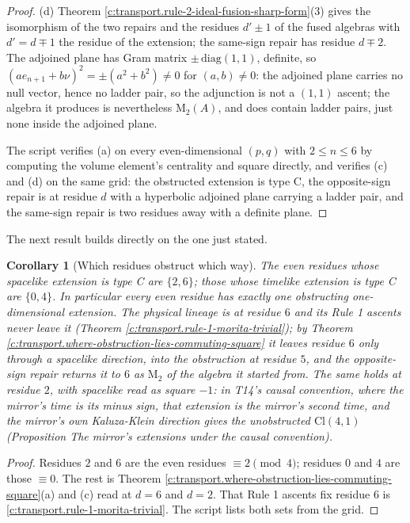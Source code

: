 \documentclass[11pt]{article}
\newtheorem{corollary}[theorem]{Corollary}
\theoremstyle{definition}
\theoremstyle{plain}
\newcommand{\changedmark}[2]{\marginpar{\raggedright\scriptsize\color{#1}#2}}
\providecommand{\Cl}{}\renewcommand{\Cl}{\mathrm{Cl}}
\providecommand{\Mat}{}\renewcommand{\Mat}{\mathrm{M}}
\begin{document}
\begin{proof}
(d) Theorem \ref{c:transport.rule-2-ideal-fusion-sharp-form}(3) gives the isomorphism of the two repairs and the residues $d' \pm 1$ of the fused algebras with $d' = d \mp 1$ the residue of the extension; the same-sign repair has residue $d \mp 2$. The adjoined plane has Gram matrix $\pm\,\mathrm{diag}(1,1)$, definite, so $(a e_{n+1} + b\nu)^2 = \pm(a^2 + b^2) \neq 0$ for $(a,b) \neq 0$: the adjoined plane carries no null vector, hence no ladder pair, so the adjunction is not a $(1,1)$ ascent; the algebra it produces is nevertheless $\Mat_2(A)$, and does contain ladder pairs, just none inside the adjoined plane.

The script verifies (a) on every even-dimensional $(p,q)$ with $2 \leq n \leq 6$ by computing the volume element's centrality and square directly, and verifies (c) and (d) on the same grid: the obstructed extension is type C, the opposite-sign repair is at residue $d$ with a hyperbolic adjoined plane carrying a ladder pair, and the same-sign repair is two residues away with a definite plane.

\end{proof}

The next result builds directly on the one just stated.

\begin{corollary}[Which residues obstruct which way]\label{c:transport.which-residues-obstruct-which-way}
\changedmark{BurntOrange}{changed since the deposit}
The even residues whose spacelike extension is type C are $\{2, 6\}$; those whose timelike extension is type C are $\{0, 4\}$. In particular every even residue has exactly one obstructing one-dimensional extension. The physical lineage is at residue $6$ and its Rule 1 ascents never leave it (Theorem \ref{c:transport.rule-1-morita-trivial}); by Theorem \ref{c:transport.where-obstruction-lies-commuting-square} it leaves residue $6$ only through a spacelike direction, into the obstruction at residue $5$, and the opposite-sign repair returns it to $6$ as $\Mat_2$ of the algebra it started from. The same holds at residue $2$, with spacelike read as square $-1$: in T14's causal convention, where the mirror's time is its minus sign, that extension is the mirror's second time, and the mirror's own Kaluza-Klein direction gives the unobstructed $\Cl(4,1)$ (Proposition \emph{The mirror's extensions under the causal convention}).
\end{corollary}
\begin{proof}
Residues $2$ and $6$ are the even residues $\equiv 2 \pmod 4$; residues $0$ and $4$ are those $\equiv 0$. The rest is Theorem \ref{c:transport.where-obstruction-lies-commuting-square}(a) and (c) read at $d = 6$ and $d = 2$. That Rule 1 ascents fix residue $6$ is \ref{c:transport.rule-1-morita-trivial}. The script lists both sets from the grid.

\end{proof}
\end{document}
